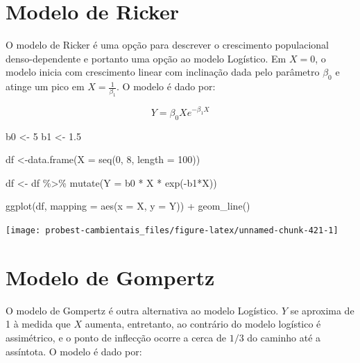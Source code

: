 \documentclass[
]{book}
\newenvironment{Shaded}{\begin{snugshade}}{\end{snugshade}}
\newcommand{\AttributeTok}[1]{\textcolor[rgb]{0.77,0.63,0.00}{#1}}
\newcommand{\DecValTok}[1]{\textcolor[rgb]{0.00,0.00,0.81}{#1}}
\newcommand{\FloatTok}[1]{\textcolor[rgb]{0.00,0.00,0.81}{#1}}
\newcommand{\FunctionTok}[1]{\textcolor[rgb]{0.00,0.00,0.00}{#1}}
\newcommand{\NormalTok}[1]{#1}
\newcommand{\OtherTok}[1]{\textcolor[rgb]{0.56,0.35,0.01}{#1}}
\newcommand{\SpecialCharTok}[1]{\textcolor[rgb]{0.00,0.00,0.00}{#1}}
\begin{document}
\hypertarget{modelo-de-ricker}{%
\section{Modelo de Ricker}\label{modelo-de-ricker}}

O modelo de Ricker é uma opção para descrever o crescimento populacional denso-dependente e portanto uma opção ao modelo Logístico. Em \(X = 0\), o modelo inicia com crescimento linear com inclinação dada pelo parâmetro \(\beta_0\) e atinge um pico em \(X = \frac{1}{\beta_1}\). O modelo é dado por:

\[Y = \beta_0 X e^{-\beta_1 X}\]

\begin{Shaded}
\begin{Highlighting}[]
\NormalTok{b0 }\OtherTok{\textless{}{-}} \DecValTok{5}
\NormalTok{b1 }\OtherTok{\textless{}{-}} \FloatTok{1.5}

\NormalTok{df }\OtherTok{\textless{}{-}}\FunctionTok{data.frame}\NormalTok{(}\AttributeTok{X =} \FunctionTok{seq}\NormalTok{(}\DecValTok{0}\NormalTok{, }\DecValTok{8}\NormalTok{, }\AttributeTok{length =} \DecValTok{100}\NormalTok{))}

\NormalTok{df }\OtherTok{\textless{}{-}}\NormalTok{ df }\SpecialCharTok{\%\textgreater{}\%} \FunctionTok{mutate}\NormalTok{(}\AttributeTok{Y =}\NormalTok{ b0 }\SpecialCharTok{*}\NormalTok{ X }\SpecialCharTok{*} \FunctionTok{exp}\NormalTok{(}\SpecialCharTok{{-}}\NormalTok{b1}\SpecialCharTok{*}\NormalTok{X))}

\FunctionTok{ggplot}\NormalTok{(df, }\AttributeTok{mapping =} \FunctionTok{aes}\NormalTok{(}\AttributeTok{x =}\NormalTok{ X, }\AttributeTok{y =}\NormalTok{ Y)) }\SpecialCharTok{+}
  \FunctionTok{geom\_line}\NormalTok{()}
\end{Highlighting}
\end{Shaded}

\begin{center}\texttt{[image: probest-cambientais\_files/figure-latex/unnamed-chunk-421-1]} \end{center}

\hypertarget{modelo-de-gompertz}{%
\section{Modelo de Gompertz}\label{modelo-de-gompertz}}

O modelo de Gompertz é outra alternativa ao modelo Logístico. \(Y\) se aproxima de 1 à medida que \(X\) aumenta, entretanto, ao contrário do modelo logístico é assimétrico, e o ponto de inflecção ocorre a cerca de \(1/3\) do caminho até a assíntota. O modelo é dado por:
\end{document}
